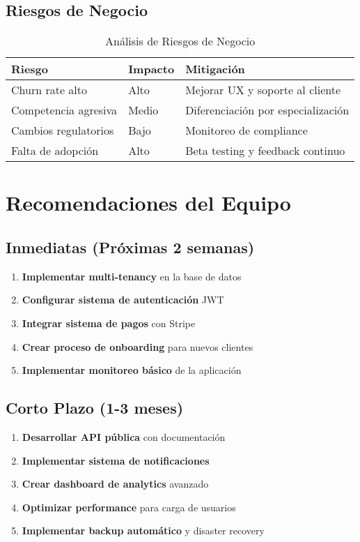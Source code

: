 \documentclass[12pt,a4paper]{article}
\begin{document}
\subsection{Riesgos de Negocio}
\begin{table}[h]
\centering
\begin{tabular}{|l|l|l|}
\hline
\textbf{Riesgo} & \textbf{Impacto} & \textbf{Mitigación} \\
\hline
Churn rate alto & Alto & Mejorar UX y soporte al cliente \\
Competencia agresiva & Medio & Diferenciación por especialización \\
Cambios regulatorios & Bajo & Monitoreo de compliance \\
Falta de adopción & Alto & Beta testing y feedback continuo \\
\hline
\end{tabular}
\caption{Análisis de Riesgos de Negocio}
\end{table}

\section{Recomendaciones del Equipo}

\subsection{Inmediatas (Próximas 2 semanas)}
\begin{enumerate}
    \item \textbf{Implementar multi-tenancy} en la base de datos
    \item \textbf{Configurar sistema de autenticación} JWT
    \item \textbf{Integrar sistema de pagos} con Stripe
    \item \textbf{Crear proceso de onboarding} para nuevos clientes
    \item \textbf{Implementar monitoreo básico} de la aplicación
\end{enumerate}

\subsection{Corto Plazo (1-3 meses)}
\begin{enumerate}
    \item \textbf{Desarrollar API pública} con documentación
    \item \textbf{Implementar sistema de notificaciones}
    \item \textbf{Crear dashboard de analytics} avanzado
    \item \textbf{Optimizar performance} para carga de usuarios
    \item \textbf{Implementar backup automático} y disaster recovery
\end{enumerate}
\end{document}
